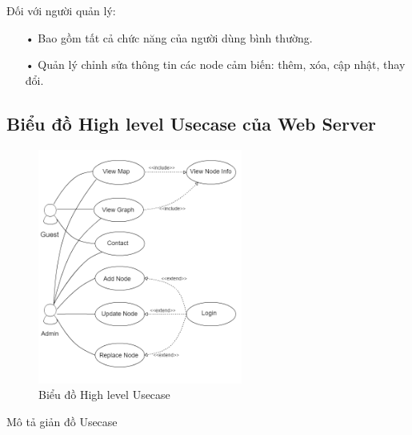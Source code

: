 Đối với người quản lý:
\begin{itemize}
\item[•] Bao gồm tất cả chức năng của người dùng bình thường.
\item[•] Quản lý chỉnh sửa thông tin các node cảm biến: thêm, xóa, cập nhật, thay đổi.
\end{itemize}

\subsection*{Biểu đồ High level Usecase của Web Server}
\begin{figure}[H]
\centering    
\includegraphics[width=0.6\textwidth]{usecase_diagram}
\caption[Biểu đồ High level Usecase]{Biểu đồ High level Usecase }
\label{fig:usecase_diagram}
\end{figure}
Mô tả giản đồ Usecase
